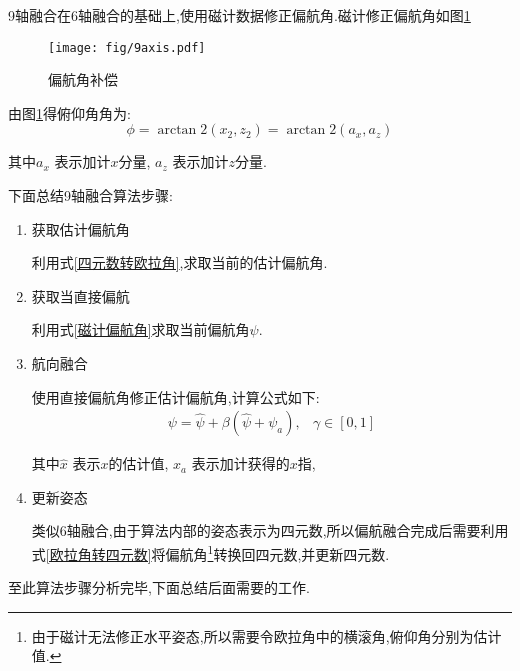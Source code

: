 9轴融合在6轴融合的基础上,使用磁计数据修正偏航角.磁计修正偏航角如图\ref{偏航角补偿}
\begin{figure}
\begin{center}
    \texttt{[image: fig/9axis.pdf]}
    \caption{偏航角补偿}\label{偏航角补偿}
\end{center}
\end{figure}

由图\ref{偏航角补偿}得俯仰角角为:
\begin{equation}\label{磁计偏航角}
    \phi = \arctan2(x_2,z_2) = \arctan2(a_x,a_z)
\end{equation} 

其中$a_x$   表示加计$x$分量,
$a_z$       表示加计$z$分量.

下面总结9轴融合算法步骤:
\begin{enumerate}
    \item 获取估计偏航角

        利用式\ref{四元数转欧拉角},求取当前的估计偏航角.

    \item 获取当直接偏航

        利用式\ref{磁计偏航角}求取当前偏航角$\psi$.

    \item 航向融合

        使用直接偏航角修正估计偏航角,计算公式如下:
        \begin{equation}\label{偏航融合}
            \begin{array}{ll}
                    \psi   = \hat{\psi} + \beta(\hat{\psi}+\psi_a), & \gamma \in [0, 1]
            \end{array}
        \end{equation} 
            
            其中$\hat{x}$   表示$x$的估计值, 
            $x_a$           表示加计获得的$x$指,
    \item 更新姿态

        类似6轴融合,由于算法内部的姿态表示为四元数,所以偏航融合完成后需要利用式\ref{欧拉角转四元数}将偏航角\footnote{由于磁计无法修正水平姿态,所以需要令欧拉角中的横滚角,俯仰角分别为估计值.}转换回四元数,并更新四元数.
\end{enumerate}

至此算法步骤分析完毕,下面总结后面需要的工作.

